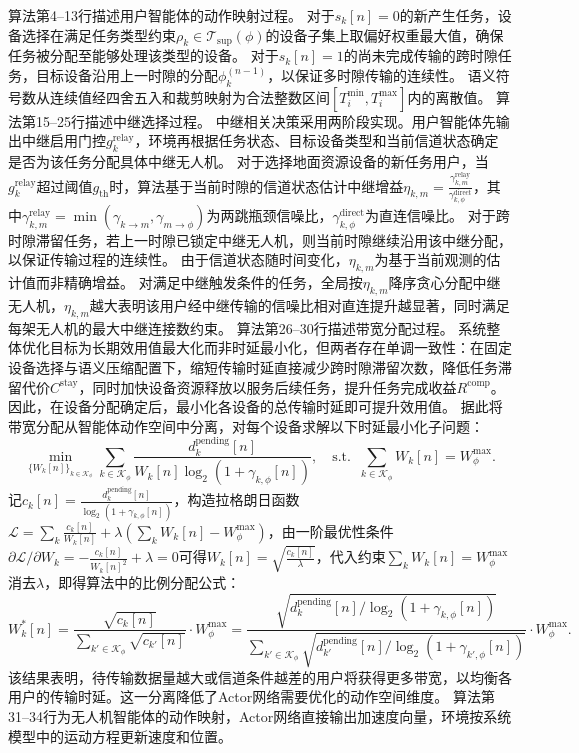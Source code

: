 算法第4--13行描述用户智能体的动作映射过程。
对于$s_k[n]=0$的新产生任务，设备选择在满足任务类型约束$\rho_k \in \mathcal{T}_{\text{sup}}(\phi)$的设备子集上取偏好权重最大值，确保任务被分配至能够处理该类型的设备。
对于$s_k[n]=1$的尚未完成传输的跨时隙任务，目标设备沿用上一时隙的分配$\phi_k^{(n-1)}$，以保证多时隙传输的连续性。
语义符号数从连续值经四舍五入和裁剪映射为合法整数区间$[T_i^{\min}, T_i^{\max}]$内的离散值。
算法第15--25行描述中继选择过程。
中继相关决策采用两阶段实现。用户智能体先输出中继启用门控$g_k^{\text{relay}}$，环境再根据任务状态、目标设备类型和当前信道状态确定是否为该任务分配具体中继无人机。
对于选择地面资源设备的新任务用户，当$g_k^{\text{relay}}$超过阈值$g_{\text{th}}$时，算法基于当前时隙的信道状态估计中继增益$\eta_{k,m} = \frac{\gamma_{k,m}^{\text{relay}}}{\gamma_{k,\phi}^{\text{direct}}}$，其中$\gamma_{k,m}^{\text{relay}} = \min(\gamma_{k \to m}, \gamma_{m \to \phi})$为两跳瓶颈信噪比，$\gamma_{k,\phi}^{\text{direct}}$为直连信噪比。
对于跨时隙滞留任务，若上一时隙已锁定中继无人机，则当前时隙继续沿用该中继分配，以保证传输过程的连续性。
由于信道状态随时间变化，$\eta_{k,m}$为基于当前观测的估计值而非精确增益。
对满足中继触发条件的任务，全局按$\eta_{k,m}$降序贪心分配中继无人机，$\eta_{k,m}$越大表明该用户经中继传输的信噪比相对直连提升越显著，同时满足每架无人机的最大中继连接数约束。
算法第26--30行描述带宽分配过程。
系统整体优化目标为长期效用值最大化而非时延最小化，但两者存在单调一致性：在固定设备选择与语义压缩配置下，缩短传输时延直接减少跨时隙滞留次数，降低任务滞留代价$C^{\text{stay}}$，同时加快设备资源释放以服务后续任务，提升任务完成收益$R^{\text{comp}}$。
因此，在设备分配确定后，最小化各设备的总传输时延即可提升效用值。
据此将带宽分配从智能体动作空间中分离，对每个设备求解以下时延最小化子问题：
\begin{equation}
\min_{\{W_k[n]\}_{k\in\mathcal{K}_\phi}} \sum_{k \in \mathcal{K}_\phi} \frac{d_k^{\text{pending}}[n]}{W_k[n] \log_2(1+\gamma_{k,\phi}[n])}, \quad \text{s.t.} \;\; \sum_{k \in \mathcal{K}_\phi} W_k[n] = W_\phi^{\max}.
\label{eq:bw_opt}
\end{equation}
记$c_k[n] = \frac{d_k^{\text{pending}}[n]}{\log_2(1+\gamma_{k,\phi}[n])}$，构造拉格朗日函数$\mathcal{L} = \sum_k \frac{c_k[n]}{W_k[n]} + \lambda(\sum_k W_k[n] - W_\phi^{\max})$，由一阶最优性条件$\partial \mathcal{L}/\partial W_k = -\frac{c_k[n]}{W_k[n]^2} + \lambda = 0$可得$W_k[n] = \sqrt{\frac{c_k[n]}{\lambda}}$，代入约束$\sum_k W_k[n] = W_\phi^{\max}$消去$\lambda$，即得算法中的比例分配公式：
\begin{equation}
W_k^*[n] = \frac{\sqrt{c_k[n]}}{\sum_{k'\in\mathcal{K}_\phi}\sqrt{c_{k'}[n]}} \cdot W_\phi^{\max} = \frac{\sqrt{d_k^{\text{pending}}[n] / \log_2(1+\gamma_{k,\phi}[n])}}{\sum_{k'\in\mathcal{K}_\phi} \sqrt{d_{k'}^{\text{pending}}[n] / \log_2(1+\gamma_{k',\phi}[n])}} \cdot W_\phi^{\max}.
\label{eq:bw_solution}
\end{equation}
该结果表明，待传输数据量越大或信道条件越差的用户将获得更多带宽，以均衡各用户的传输时延。这一分离降低了Actor网络需要优化的动作空间维度。
算法第31--34行为无人机智能体的动作映射，Actor网络直接输出加速度向量，环境按系统模型中的运动方程更新速度和位置。

